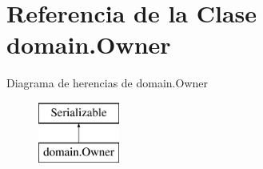 \hypertarget{classdomain_1_1_owner}{}\section{Referencia de la Clase domain.\+Owner}
\label{classdomain_1_1_owner}
Diagrama de herencias de domain.\+Owner\begin{figure}[H]
\begin{center}
\leavevmode
\includegraphics[height=2.000000cm]{classdomain_1_1_owner}
\end{center}
\end{figure}
